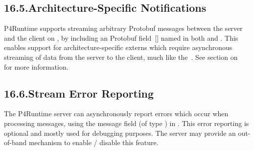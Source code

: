 \documentclass[11pt]{article}
\begin{document}
{%
\subsection{16.5.\hspace*{0.5em}Architecture-Specific Notifications}\label{sec-architecture-specific-notifications}%

\noindent{}P4Runtime supports streaming arbitrary Protobuf messages between the server and
the client on , by including an  Protobuf field~[]
named  in both  and . This
enables support for architecture-specific externs which require asynchronous
streaming of data from the server to the client, much like the~. See section on~ for more information.%

\subsection{16.6.\hspace*{0.5em}Stream Error Reporting}\label{sec-stream-error-reporting}%

\noindent{}The P4Runtime server can asynchronously report errors which occur when
processing  messages, using the  message field (of
type ) in . This error reporting is
optional and mostly used for debugging purposes. The server may provide an
out-of-band mechanism to enable / disable this feature.%

}
\end{document}
